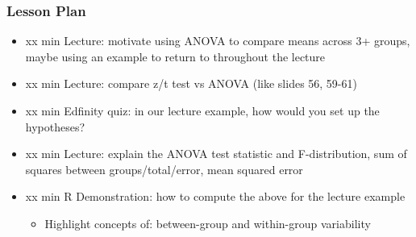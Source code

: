 \begin{frame}
    \frametitle{Lesson Plan}
    \begin{itemize}
        \item xx min Lecture: motivate using ANOVA to compare means across 3+ groups, maybe using an example to return to throughout the lecture
        \item xx min Lecture: compare z/t test vs ANOVA (like slides 56, 59-61)
        \item xx min Edfinity quiz: in our lecture example, how would you set up the hypotheses?
        \item xx min Lecture: explain the ANOVA test statistic and F-distribution, sum of squares between groups/total/error, mean squared error
        \item xx min R Demonstration: how to compute the above for the lecture example
        \begin{itemize}
            \item Highlight concepts of: between-group and within-group variability 
        \end{itemize}
    \end{itemize}
\end{frame}


